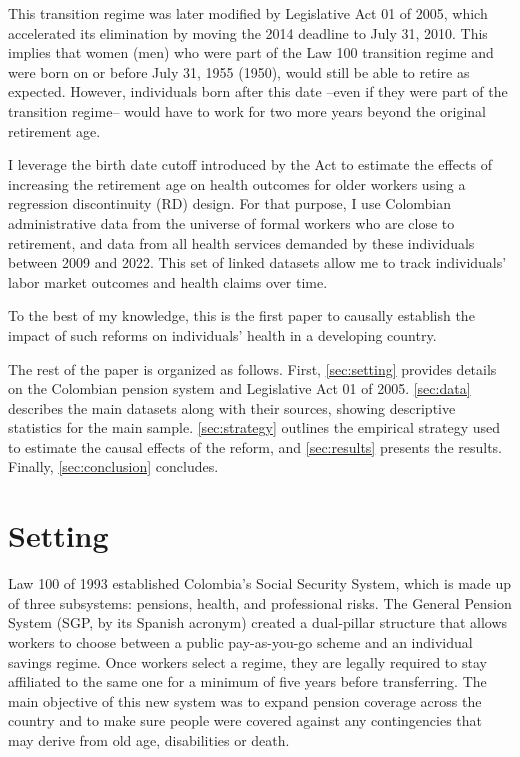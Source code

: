 \documentclass[12pt, a4paper]{article}
\begin{document}
This transition regime was later modified by Legislative Act 01 of 2005, which accelerated its elimination by moving the 2014 deadline to July 31, 2010. This implies that women (men) who were part of the Law 100 transition regime and were born on or before July 31, 1955 (1950), would still be able to retire as expected. However, individuals born after this date --even if they were part of the transition regime-- would have to work for two more years beyond the original retirement age.

I leverage the birth date cutoff introduced by the Act to estimate the effects of increasing the retirement age on health outcomes for older workers using a regression discontinuity (RD) design. For that purpose, I use Colombian administrative data from the universe of formal workers who are close to retirement, and data from all health services demanded by these individuals between 2009 and 2022. This set of linked datasets allow me to track individuals' labor market outcomes and health claims over time.

To the best of my knowledge, this is the first paper to causally establish the impact of such reforms on individuals' health in a developing country. 

The rest of the paper is organized as follows. First, \autoref{sec:setting} provides details on the Colombian pension system and Legislative Act 01 of 2005. \autoref{sec:data} describes the main datasets along with their sources, showing descriptive statistics for the main sample. \autoref{sec:strategy} outlines the empirical strategy used to estimate the causal effects of the reform, and \autoref{sec:results} presents the results. Finally, \autoref{sec:conclusion} concludes. 



\section{Setting \label{sec:setting}}

Law 100 of 1993 established Colombia’s Social Security System, which is made up of three subsystems: pensions, health, and professional risks. The General Pension System (SGP, by its Spanish acronym) created a dual-pillar structure that allows workers to choose between a public pay-as-you-go scheme and an individual savings regime. Once workers select a regime, they are legally required to stay affiliated to the same one for a minimum of five years before transferring. The main objective of this new system was to expand pension coverage across the country and to make sure people were covered against any contingencies that may derive from old age, disabilities or death.
\end{document}
